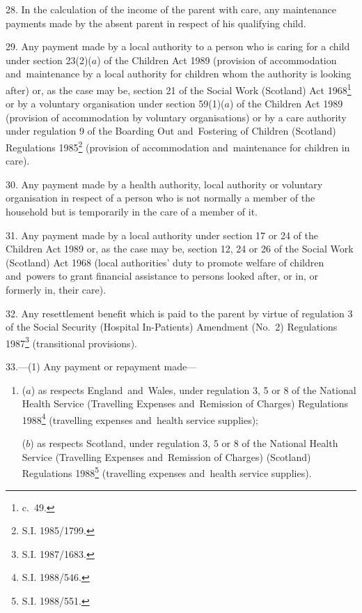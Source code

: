 \documentclass[12pt,a4paper]{article}
\begin{document}
\medskip

28.  In the calculation of the income of the parent with care, any maintenance payments made by the absent parent in respect of his qualifying child.

\medskip

29.  Any payment made by a local authority to a person who is caring for a child under section 23(2)($a$) of the Children Act 1989 (provision of accommodation and~maintenance by a local authority for children whom the authority is looking after) or, as the case may be, section 21 of the Social Work (Scotland) Act 1968\footnote{ c.~49.} or by a voluntary organisation under section 59(1)($a$) of the Children Act 1989 (provision of accommodation by voluntary organisations) or by a care authority under regulation 9 of the Boarding Out and~Fostering of Children (Scotland) Regulations 1985\footnote{\frenchspacing S.I. 1985/1799.} (provision of accommodation and~maintenance for children in care).

\medskip

30.  Any payment made by a health authority, local authority or voluntary organisation in respect of a person who is not normally a member of the household but is temporarily in the care of a member of it.

\medskip

31.  Any payment made by a local authority under section 17 or 24 of the Children Act 1989 or, as the case may be, section 12, 24 or 26 of the Social Work (Scotland) Act 1968 (local authorities' duty to promote welfare of children and~powers to grant financial assistance to persons looked after, or in, or formerly in, their care).

\medskip

32.  Any resettlement benefit which is paid to the parent by virtue of regulation 3 of the Social Security (Hospital In-Patients) Amendment (No.\ 2) Regulations 1987\footnote{\frenchspacing S.I. 1987/1683.} (transitional provisions).

\medskip

33.—(1) Any payment or repayment made—
\begin{enumerate}\item[]
($a$) as respects England~and~Wales, under regulation 3, 5 or 8 of the National Health Service (Travelling Expenses and~Remission of Charges) Regulations 1988\footnote{\frenchspacing S.I. 1988/546.} (travelling expenses and~health service supplies);

($b$) as respects Scotland, under regulation 3, 5 or 8 of the National Health Service (Travelling Expenses and~Remission of Charges) (Scotland) Regulations 1988\footnote{\frenchspacing S.I. 1988/551.} (travelling expenses and~health service supplies).
\end{enumerate}
\end{document}
